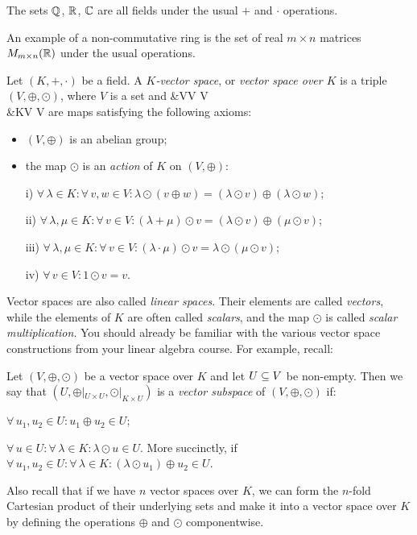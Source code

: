 \be
The sets $\mathbb{Q}$, $\mathbb{R}$, $\mathbb{C}$ are all fields under the usual $+$ and $\cdot$ operations.
\ee

\be
An example of a non-commutative ring is the set of real $m\times n$ matrices $M_{m\times n}(\mathbb{R})$ under the usual operations.
\ee

\bd
Let $(K,+,\cdot)$ be a field. A $K$\emph{-vector space}, or \emph{vector space over $K$} is a triple $(V,\oplus,\odot)$, where $V$ is a set and 
\oplus &\cl V\times V \to V\\
\odot  &\cl K\times V \to V
\ei
are maps satisfying the following axioms:
\begin{itemize}
\item $(V,\oplus)$ is an abelian group;
\item the map $\odot$ is an \emph{action} of $K$ on $(V,\oplus)$:
\ben
\item[i)] $\forall \, \lambda \in K : \forall \, v,w \in V : \lambda\odot(v\oplus w)=(\lambda\odot v)\oplus (\lambda\odot w)$;
\item[ii)] $\forall \, \lambda,\mu \in K : \forall \, v \in V : (\lambda+\mu)\odot v= (\lambda \odot v) \oplus (\mu \odot v)$;
\item[iii)] $\forall \, \lambda,\mu \in K : \forall \, v \in V : (\lambda\cdot\mu)\odot v= \lambda \odot (\mu \odot v)$;
\item[iv)] $\forall \, v \in V : 1\odot v = v$.
\een
\end{itemize}
\ed

Vector spaces are also called \emph{linear spaces}. Their elements are called \emph{vectors}, while the elements of $K$ are often called \emph{scalars}, and the map $\odot$ is called \emph{scalar multiplication}. You should already be familiar with the various vector space constructions from your linear algebra course. For example, recall:

\bd
Let $(V,\oplus,\odot)$ be a vector space over $K$ and let $U\subseteq V$ be non-empty. Then we say that $(U,\oplus|_{U\times U},\odot|_{K\times U})$ is a \emph{vector subspace} of $(V,\oplus,\odot)$ if:
\ben
\item[i)] $\forall \, u_1,u_2\in U : u_1\oplus u_2 \in U$;
\item[ii)] $\forall \, u\in U : \forall \, \lambda \in K: \lambda\odot u \in U$.
\een
More succinctly, if $\forall\,u_1,u_2\in U:\forall \, \lambda \in K: (\lambda\odot u_1)\oplus u_2\in U$. 
\ed

Also recall that if we have $n$ vector spaces over $K$, we can form the $n$-fold Cartesian product of their underlying sets and make it into a vector space over $K$ by defining the operations $\oplus$ and $\odot$ componentwise.

